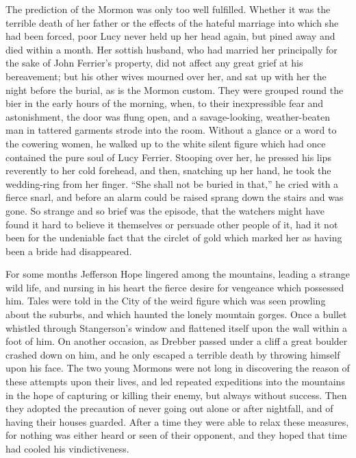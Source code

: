 \documentclass[12pt,english,oneside]{book}
\begin{document}
The prediction of the Mormon was only too well fulfilled. Whether
it was the terrible death of her father or the effects of the hateful
marriage into which she had been forced, poor Lucy never held up her
head again, but pined away and died within a month. Her sottish husband,
who had married her principally for the sake of John Ferrier's property,
did not affect any great grief at his bereavement; but his other wives
mourned over her, and sat up with her the night before the burial,
as is the Mormon custom. They were grouped round the bier in the early
hours of the morning, when, to their inexpressible fear and astonishment,
the door was flung open, and a savage-looking, weather-beaten man
in tattered garments strode into the room. Without a glance or a word
to the cowering women, he walked up to the white silent figure which
had once contained the pure soul of Lucy Ferrier. Stooping over her,
he pressed his lips reverently to her cold forehead, and then, snatching
up her hand, he took the wedding-ring from her finger. {}``She shall
not be buried in that,'' he cried with a fierce snarl, and before
an alarm could be raised sprang down the stairs and was gone. So strange
and so brief was the episode, that the watchers might have found it
hard to believe it themselves or persuade other people of it, had
it not been for the undeniable fact that the circlet of gold which
marked her as having been a bride had disappeared.

For some months Jefferson Hope lingered among the mountains, leading
a strange wild life, and nursing in his heart the fierce desire for
vengeance which possessed him. Tales were told in the City of the
weird figure which was seen prowling about the suburbs, and which
haunted the lonely mountain gorges. Once a bullet whistled through
Stangerson's window and flattened itself upon the wall within a foot
of him. On another occasion, as Drebber passed under a cliff a great
boulder crashed down on him, and he only escaped a terrible death
by throwing himself upon his face. The two young Mormons were not
long in discovering the reason of these attempts upon their lives,
and led repeated expeditions into the mountains in the hope of capturing
or killing their enemy, but always without success. Then they adopted
the precaution of never going out alone or after nightfall, and of
having their houses guarded. After a time they were able to relax
these measures, for nothing was either heard or seen of their opponent,
and they hoped that time had cooled his vindictiveness.
\end{document}
